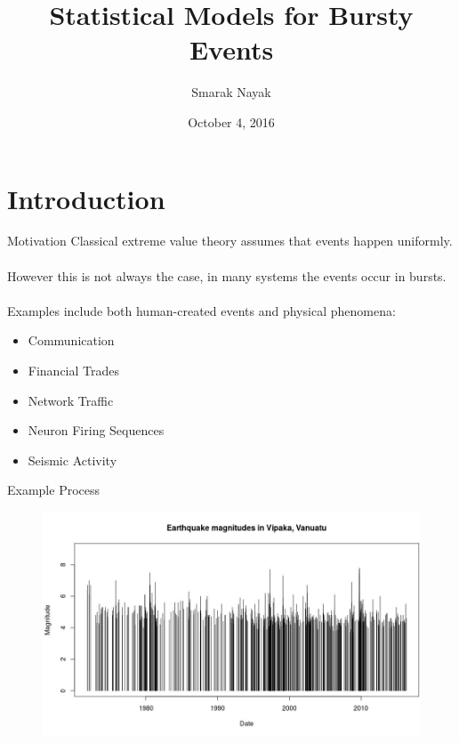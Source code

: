 \documentclass{beamer}
\title{Statistical Models for Bursty Events}
\author{Smarak Nayak}
\date{October 4, 2016}
\begin{document}
 
\frame{\titlepage}
\section{Introduction}

\begin{frame}{Motivation}
	Classical extreme value theory assumes that events happen uniformly. \\~\\
	
	However this is not always the case, in many systems the events occur in bursts. \\~\\
	
	Examples include both human-created events and physical phenomena:
		\begin{itemize}
		\item Communication
		\item Financial Trades 
		\item Network Traffic
		\item Neuron Firing Sequences
		\item Seismic Activity
	    \end{itemize}
	
\end{frame}

\begin{frame}{Example Process }
    \begin{figure}
        \hspace{-0.5cm}
        \includegraphics[scale=0.45]{EarthQuakeData.jpeg}
    \end{figure}

\end{frame}
\end{document}
